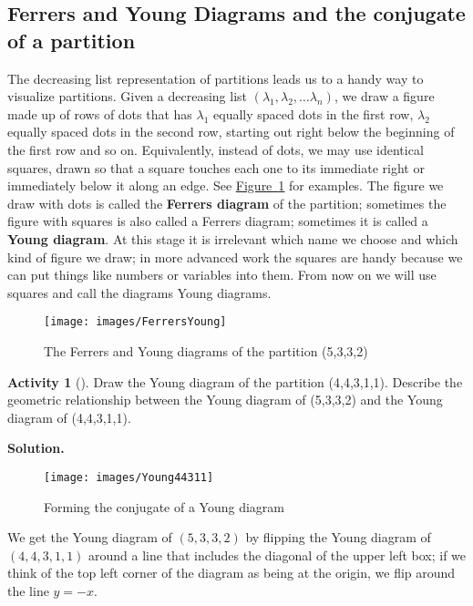 \documentclass[10pt,]{book}
\newcommand{\terminology}[1]{\textbf{#1}}
\theoremstyle{plain}
\theoremstyle{definition}
\newtheorem{activity}[project]{Activity}
\numberwithin{equation}{chapter}
\begin{document}
\subsection[{Ferrers and Young Diagrams and the conjugate of a partition}]{Ferrers and Young Diagrams and the conjugate of a partition}\label{subsection-38}
The decreasing list representation of partitions leads us to a handy way to visualize partitions. Given a decreasing list \((\lambda_1,\lambda_2,\ldots \lambda_n)\), we draw a figure made up of rows of dots that has \(\lambda_1\) equally spaced dots in the first row, \(\lambda_2\) equally spaced dots in the second row, starting out right below the beginning of the first row and so on. Equivalently, instead of dots, we may use identical squares, drawn so that a square touches each one to its immediate right or immediately below it along an edge. See \hyperref[FerrersYoung]{Figure~\ref{FerrersYoung}} for examples. The figure we draw with dots is called the \terminology{Ferrers diagram} of the partition; sometimes the figure with squares is also called a Ferrers diagram; sometimes it is called a \terminology{Young diagram}. At this stage it is irrelevant which name we choose and which kind of figure we draw; in more advanced work the squares are handy because we can put things like numbers or variables into them.  From now on we will use squares and call the diagrams Young diagrams.%
\begin{figure}
\centering
\texttt{[image: images/FerrersYoung]}
\caption{The Ferrers and Young diagrams of the partition (5,3,3,2)\label{FerrersYoung}}
\end{figure}
\begin{activity}[]\label{activity-139}
Draw the Young diagram of the partition (4,4,3,1,1). Describe the geometric relationship between the Young diagram of (5,3,3,2) and the Young diagram of (4,4,3,1,1).%
\par\medskip\noindent%
\textbf{Solution.}\quad \leavevmode%
\begin{figure}
\centering
\texttt{[image: images/Young44311]}
\caption{Forming the conjugate of a Young diagram\label{Young44311}}
\end{figure}
We get the Young diagram of \((5,3,3,2)\) by flipping the Young diagram of \((4,4,3,1,1)\) around a line that includes the diagonal of the upper left box; if we think of the top left corner of the diagram as being at the origin, we flip around the line \(y=-x\).%
\end{activity}
\end{document}

